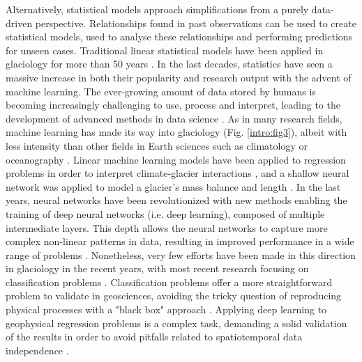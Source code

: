 Alternatively, statistical models approach simplifications from a purely data-driven perspective. Relationships found in past observations can be used to create statistical models, used to analyse these relationships and performing predictions for unseen cases. Traditional linear statistical models have been applied in glaciology for more than 50 years \citep{hoinkes_glacier_1968, martin_correlation_1974}. In the last decades, statistics have seen a massive increase in both their popularity and research output with the advent of machine learning. The ever-growing amount of data stored by humans is becoming increasingly challenging to use, process and interpret, leading to the development of advanced methods in data science \citep{mjolsness_machine_2001}. As in many research fields, machine learning has made its way into glaciology (Fig.  \ref{intro:fig3}), albeit with less intensity than other fields in Earth sciences such as climatology \citep[e.g.,][]{liu_application_2016,ham_deep_2019,jiang_deep_2018} or oceanography \citep[e.g.,][]{ducournau_deep_2016,lguensat_learning_2019}. Linear machine learning models have been applied to regression problems in order to interpret climate-glacier interactions \citep{maussion_enso_2015}, and a shallow neural network was applied to model a glacier's mass balance and length \citep{steiner_application_2005,steiner_sensitivity_2008}. In the last years, neural networks have been revolutionized with new methods enabling the training of deep neural networks (i.e. deep learning), composed of multiple intermediate layers. This depth allows the neural networks to capture more complex non-linear patterns in data, resulting in improved performance in a wide range of problems \citep{wang_origin_2017}. Nonetheless, very few efforts have been made in this direction in glaciology in the recent years, with most recent research focusing on classification problems \citep{mohajerani_detection_2019, baumhoer_automated_2019, zhang_automatically_2019}. Classification problems offer a more straightforward problem to validate in geosciences, avoiding the tricky question of reproducing physical processes with a "black box" approach \citep{karpatne_theory-guided_2017}. Applying deep learning to geophysical regression problems is a complex task, demanding a solid validation of the results in order to avoid pitfalls related to spatiotemporal data independence \citep{roberts_cross-validation_2017}. 

